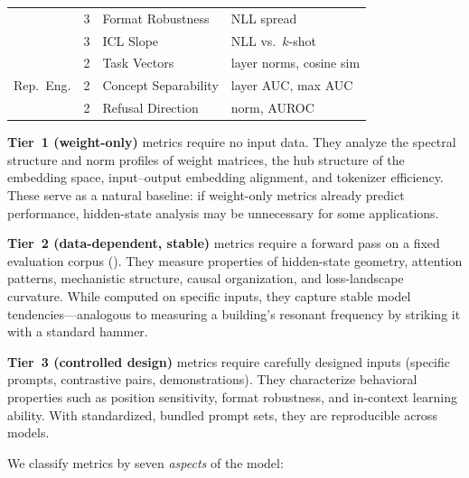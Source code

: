 \documentclass{article}
\begin{document}
\begin{table}[t]
\begin{tabular}{@{}llll@{}}
  & 3 & Format Robustness & NLL spread \citep{sclar2023quantifying} \\
  & 3 & ICL Slope & NLL vs.\ $k$-shot \\
\midrule
\multirow{3}{*}{Rep.\ Eng.}
  & 2 & Task Vectors & layer norms, cosine sim \\
  & 2 & Concept Separability & layer AUC, max AUC \\
  & 2 & Refusal Direction & norm, AUROC \citep{arditi2024refusal} \\
\bottomrule
\end{tabular}
\end{table}

\textbf{Tier~1 (weight-only)} metrics require no input data. They analyze the spectral structure and norm profiles of weight matrices, the hub structure of the embedding space, input--output embedding alignment, and tokenizer efficiency. These serve as a natural baseline: if weight-only metrics already predict performance, hidden-state analysis may be unnecessary for some applications.

\textbf{Tier~2 (data-dependent, stable)} metrics require a forward pass on a fixed evaluation corpus (). They measure properties of hidden-state geometry, attention patterns, mechanistic structure, causal organization, and loss-landscape curvature. While computed on specific inputs, they capture stable model tendencies---analogous to measuring a building's resonant frequency by striking it with a standard hammer.

\textbf{Tier~3 (controlled design)} metrics require carefully designed inputs (specific prompts, contrastive pairs, demonstrations). They characterize behavioral properties such as position sensitivity, format robustness, and in-context learning ability. With standardized, bundled prompt sets, they are reproducible across models.

We classify metrics by seven \emph{aspects} of the model:
\end{document}
